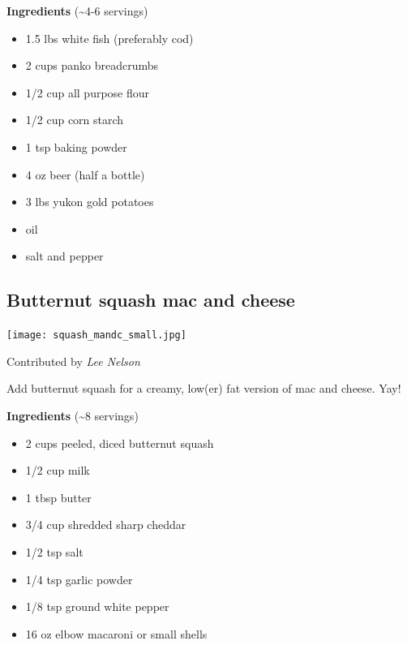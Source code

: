 \documentclass[
]{book}
\providecommand{\tightlist}{%
  \setlength{\itemsep}{0pt}\setlength{\parskip}{0pt}}
\begin{document}
\begin{blackbox}

\textbf{Ingredients} (\textasciitilde4-6 servings)

\begin{itemize}
\tightlist
\item
  1.5 lbs white fish (preferably cod)
\item
  2 cups panko breadcrumbs
\item
  1/2 cup all purpose flour
\item
  1/2 cup corn starch
\item
  1 tsp baking powder
\item
  4 oz beer (half a bottle)
\item
  3 lbs yukon gold potatoes
\item
  oil
\item
  salt and pepper
\end{itemize}

\end{blackbox}

\hypertarget{squashmc}{%
\subsection*{Butternut squash mac and cheese}\label{squashmc}}

\texttt{[image: squash\_mandc\_small.jpg]}

Contributed by \emph{Lee Nelson}

Add butternut squash for a creamy, low(er) fat version of mac and cheese. Yay!

\begin{blackbox}

\textbf{Ingredients} (\textasciitilde8 servings)

\begin{itemize}
\tightlist
\item
  2 cups peeled, diced butternut squash
\item
  1/2 cup milk
\item
  1 tbsp butter
\item
  3/4 cup shredded sharp cheddar
\item
  1/2 tsp salt
\item
  1/4 tsp garlic powder
\item
  1/8 tsp ground white pepper
\item
  16 oz elbow macaroni or small shells
\end{itemize}

\end{blackbox}
\end{document}
